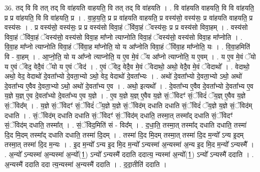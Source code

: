 \documentclass[17pt]{extarticle}
\begin{document}
36. तद् वि वि तत् तद् वि वा॑हयति वाहयति॒ वि तत् तद् वि वा॑हयति । . वि वा॑हयति वाहयति॒ वि वि वा॑हयति॒ प्र प्र वा॑हयति॒ वि वि वा॑हयति॒ प्र । . वा॒ह॒य॒ति॒ प्र प्र वा॑हयति वाहयति॒ प्र वस्य॑सो॒ वस्य॑सः॒ प्र वा॑हयति वाहयति॒ प्र वस्य॑सः । . प्र वस्य॑सो॒ वस्य॑सः॒ प्र प्र वस्य॑सो विवा॒हं ॅवि॑वा॒हं ॅवस्य॑सः॒ प्र प्र वस्य॑सो विवा॒हम् । . वस्य॑सो विवा॒हं ॅवि॑वा॒हं ॅवस्य॑सो॒ वस्य॑सो विवा॒ह मा᳚प्नो त्याप्नोति विवा॒हं ॅवस्य॑सो॒ वस्य॑सो विवा॒ह मा᳚प्नोति । . वि॒वा॒ह मा᳚प्नो त्याप्नोति विवा॒हं ॅवि॑वा॒ह मा᳚प्नोति॒ यो य आ᳚प्नोति विवा॒हं ॅवि॑वा॒ह मा᳚प्नोति॒ यः । . वि॒वा॒हमिति॑ वि - वा॒हम् । . आ॒प्नो॒ति॒ यो य आ᳚प्नो त्याप्नोति॒ य ए॒व मे॒वं ॅय आ᳚प्नो त्याप्नोति॒ य ए॒वम् । . य ए॒व मे॒वं ॅयो य ए॒वं ॅवेद॒ वेदै॒वं ॅयो य ए॒वं ॅवेद॑ । . ए॒वं ॅवेद॒ वेदै॒व मे॒वं ॅवेदाथो॒ अथो॒ वेदै॒व मे॒वं ॅवेदाथो᳚ । . वेदाथो॒ अथो॒ वेद॒ वेदाथो॑ दे॒वता᳚भ्यो दे॒वता॒भ्यो ऽथो॒ वेद॒ वेदाथो॑ दे॒वता᳚भ्यः । . अथो॑ दे॒वता᳚भ्यो दे॒वता॒भ्यो ऽथो॒ अथो॑ दे॒वता᳚भ्य ए॒वैव दे॒वता॒भ्यो ऽथो॒ अथो॑ दे॒वता᳚भ्य ए॒व । . अथो॒ इत्यथो᳚ । . दे॒वता᳚भ्य ए॒वैव दे॒वता᳚भ्यो दे॒वता᳚भ्य ए॒व य॒ज्ञे य॒ज्ञ् ए॒व दे॒वता᳚भ्यो दे॒वता᳚भ्य ए॒व य॒ज्ञे । . ए॒व य॒ज्ञे य॒ज्ञ् ए॒वैव य॒ज्ञे सं॒ॅविदꣳ॑ सं॒ॅविदं॑ ॅय॒ज्ञ् ए॒वैव य॒ज्ञे सं॒ॅविद᳚म् । . य॒ज्ञे सं॒ॅविदꣳ॑ सं॒ॅविदं॑ ॅय॒ज्ञे य॒ज्ञे सं॒ॅविद॑म् दधाति दधाति सं॒ॅविदं॑ ॅय॒ज्ञे य॒ज्ञे सं॒ॅविद॑म् दधाति । . सं॒ॅविद॑म् दधाति दधाति सं॒ॅविदꣳ॑ सं॒ॅविद॑म् दधाति॒ तस्मा॒त् तस्मा᳚द् दधाति सं॒ॅविदꣳ॑ सं॒ॅविद॑म् दधाति॒ तस्मा᳚त् । . सं॒ॅविद॒मिति॑ सं - विद᳚म् । . द॒धा॒ति॒ तस्मा॒त् तस्मा᳚द् दधाति दधाति॒ तस्मा॑ दि॒द मि॒दम् तस्मा᳚द् दधाति दधाति॒ तस्मा॑ दि॒दम् । . तस्मा॑ दि॒द मि॒दम् तस्मा॒त् तस्मा॑ दि॒द म॒न्यो᳚ ऽन्य इ॒दम् तस्मा॒त् तस्मा॑ दि॒द म॒न्यः । . इ॒द म॒न्यो᳚ ऽन्य इ॒द मि॒द म॒न्यो᳚ ऽन्यस्मा॑ अ॒न्यस्मा॑ अ॒न्य इ॒द मि॒द म॒न्यो᳚ ऽन्यस्मै᳚ । . अ॒न्यो᳚ ऽन्यस्मा॑ अ॒न्यस्मा॑ अ॒न्यो᳚(1॒) ऽन्यो᳚ ऽन्यस्मै॑ ददाति ददात्य॒ न्यस्मा॑ अ॒न्यो᳚(1॒) ऽन्यो᳚ ऽन्यस्मै॑ ददाति । . अ॒न्यस्मै॑ ददाति ददा त्य॒न्यस्मा॑ अ॒न्यस्मै॑ ददाति । . द॒दा॒तीति॑ ददाति । \newline
\pagebreak
{}
\end{document}
